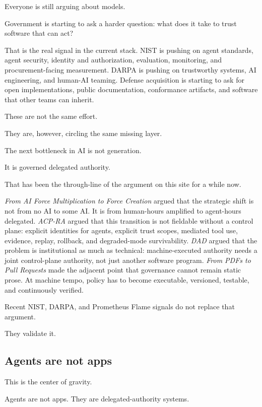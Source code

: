 \documentclass[11pt]{article}
\begin{document}
\MemoRenderHeader

Everyone is still arguing about models.

Government is starting to ask a harder question: what does it take to
trust software that can act?

That is the real signal in the current stack. NIST is pushing on agent
standards, agent security, identity and authorization, evaluation,
monitoring, and procurement-facing measurement. DARPA is pushing on
trustworthy systems, AI engineering, and human-AI teaming. Defense
acquisition is starting to ask for open implementations, public
documentation, conformance artifacts, and software that other teams can
inherit.

These are not the same effort.

They are, however, circling the same missing layer.

The next bottleneck in AI is not generation.

It is governed delegated authority.

That has been the through-line of the argument on this site for a while
now.

\emph{From AI Force Multiplication to Force Creation} argued that the
strategic shift is not from no AI to some AI. It is from human-hours
amplified to agent-hours delegated. \emph{ACP-RA} argued that this
transition is not fieldable without a control plane: explicit identities
for agents, explicit trust scopes, mediated tool use, evidence, replay,
rollback, and degraded-mode survivability. \emph{DAD} argued that the
problem is institutional as much as technical: machine-executed
authority needs a joint control-plane authority, not just another
software program. \emph{From PDFs to Pull Requests} made the adjacent
point that governance cannot remain static prose. At machine tempo,
policy has to become executable, versioned, testable, and continuously
verified.

Recent NIST, DARPA, and Prometheus Flame signals do not replace that
argument.

They validate it.

\hypertarget{agents-are-not-apps}{%
\subsection{Agents are not apps}\label{agents-are-not-apps}}

This is the center of gravity.

Agents are not apps. They are delegated-authority systems.
\end{document}
